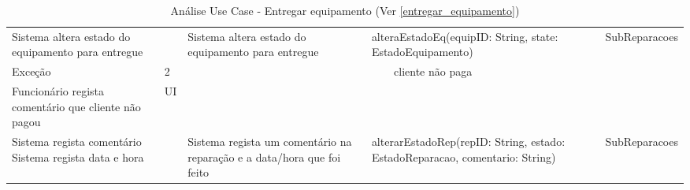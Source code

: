 \documentclass[../relatorio.tex]{subfiles}
\begin{document}
\begin{landscape}
\begin{table}[!h]
\begin{tabular}{|p{5cm}|p{1cm}|p{4cm}|p{6cm}|p{3cm}|}
                    &
                    &
            \\
            \hline
            Sistema altera estado do equipamento para entregue
                    & 
                    & Sistema altera estado do equipamento para entregue
                    & alteraEstadoEq(equipID: String, state: EstadoEquipamento)
                    & SubReparacoes
            \\
            \hline
            \rowcolor{red!30}
            Exceção
                     & 
            2 
                     & 
            \multicolumn{3}{c}{cliente não paga}
            \\
            \hline
            \rowcolor{yellow}
            Funcionário regista comentário que cliente não pagou
                    & UI
                    &
                    &
                    &
            \\
            \hline
            Sistema regista comentário
            Sistema regista data e hora
                    & 
                    & Sistema regista um comentário na reparação e a data/hora que foi feito
                    & alterarEstadoRep(repID: String, estado: EstadoReparacao, comentario: String)
                    & SubReparacoes
            \\
            \hline
        \end{tabular}
        \caption{Análise Use Case - Entregar equipamento (Ver \ref{entregar_equipamento})}
    \end{table}
\end{landscape}
\end{document}
